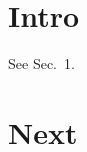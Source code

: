\documentclass{article}
\begin{document}
\section{Intro}
{\def\section{Sec.}See \section~1.}
\section{Next}
\end{document}

